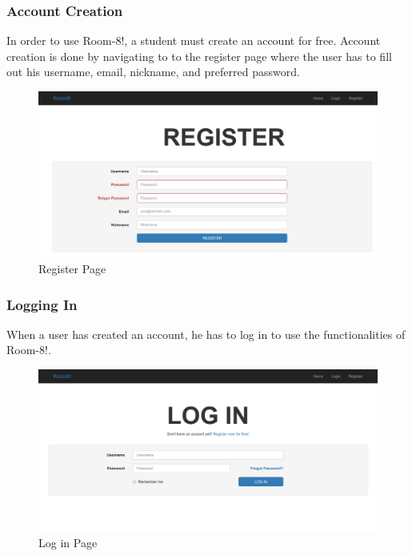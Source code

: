 \documentclass[journal]{IEEEtran}
\begin{document}
        \subsubsection{Account Creation}
        In order to use Room-8!, a student must create an account for free. Account creation is done by navigating to
        to the register page where the user has to fill out his username, email, nickname, and preferred password.
        \begin{figure}
                \includegraphics[width=\textwidth]{register.png}
                \caption{Register Page}
                \label{Registration Page}
        \end{figure}
        \subsubsection{Logging In}
        When a user has created an account, he has to log in to use the functionalities of Room-8!.
        \begin{figure}
                \includegraphics[width=\textwidth]{login.png}
                \caption{Log in Page}
                \label{Log in Page}
        \end{figure}
\end{document}
